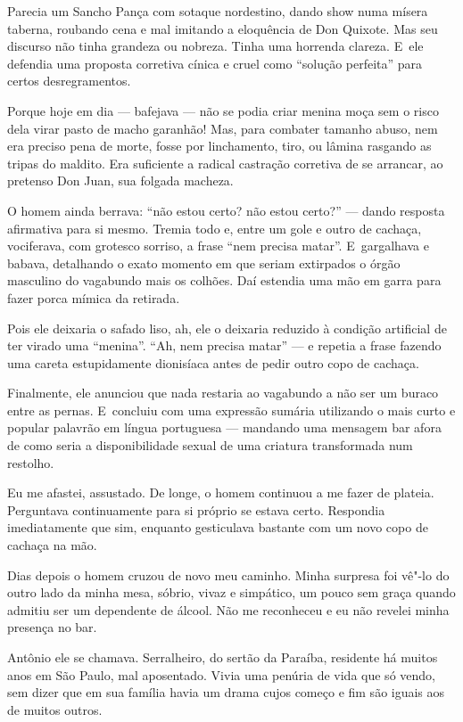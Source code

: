 Parecia um Sancho Pança com sotaque nordestino, dando show numa mísera
taberna, roubando cena e mal imitando a eloquência de Don Quixote. Mas
seu discurso não tinha grandeza ou nobreza. Tinha uma horrenda clareza.
E~ele defendia uma proposta corretiva cínica e cruel como ``solução
perfeita'' para certos desregramentos.

Porque hoje em dia --- bafejava --- não se podia criar menina moça sem o
risco dela virar pasto de macho garanhão! Mas, para combater tamanho
abuso, nem era preciso pena de morte, fosse por linchamento, tiro, ou
lâmina rasgando as tripas do maldito. Era suficiente a radical castração
corretiva de se arrancar, ao pretenso Don Juan, sua folgada macheza.

O homem ainda berrava: ``não estou certo? não estou certo?'' --- dando
resposta afirmativa para si mesmo. Tremia todo e, entre um gole e outro
de cachaça, vociferava, com grotesco sorriso, a frase ``nem precisa
matar''. E~gargalhava e babava, detalhando o exato momento em que seriam
extirpados o órgão masculino do vagabundo mais os colhões. Daí estendia
uma mão em garra para fazer porca mímica da retirada.

Pois ele deixaria o safado liso, ah, ele o deixaria reduzido à condição
artificial de ter virado uma ``menina''. ``Ah, nem precisa matar'' --- e
repetia a frase fazendo uma careta estupidamente dionisíaca antes de
pedir outro copo de cachaça.

Finalmente, ele anunciou que nada restaria ao vagabundo a não ser um
buraco entre as pernas. E~concluiu com uma expressão sumária utilizando
o mais curto e popular palavrão em língua portuguesa --- mandando uma
mensagem bar afora de como seria a disponibilidade sexual de uma
criatura transformada num restolho.

Eu me afastei, assustado. De longe, o homem continuou a me fazer de
plateia. Perguntava continuamente para si próprio se estava certo.
Respondia imediatamente que sim, enquanto gesticulava bastante com um
novo copo de cachaça na mão.

\asterisc{}

Dias depois o homem cruzou de novo meu caminho. Minha surpresa foi vê"-lo
do outro lado da minha mesa, sóbrio, vivaz e simpático, um pouco sem
graça quando admitiu ser um dependente de álcool. Não me reconheceu e eu
não revelei minha presença no bar.

Antônio ele se chamava. Serralheiro, do sertão da Paraíba, residente há
muitos anos em São Paulo, mal aposentado. Vivia uma penúria de vida que
só vendo, sem dizer que em sua família havia um drama cujos começo e fim
são iguais aos de muitos outros.


